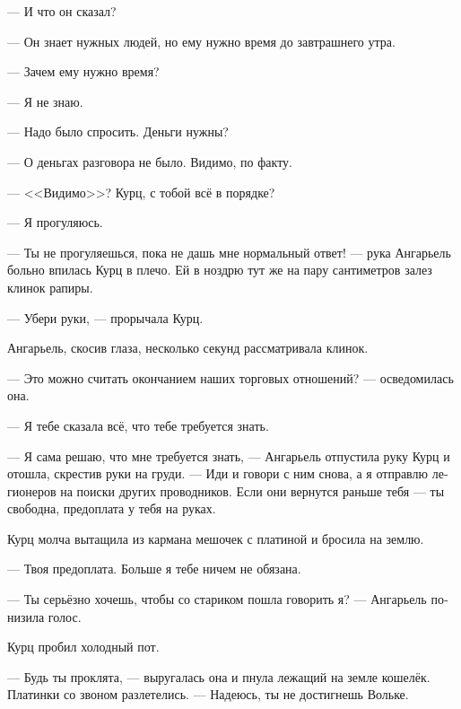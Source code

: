 \documentclass[a4paper,12pt,fleqn]{book}\usepackage{polyglossia}\setdefaultlanguage[babelshorthands=true]{russian}\setotherlanguage{english}\defaultfontfeatures{Ligatures=TeX,Mapping=tex-text}\usepackage{xcolor}\newcommand{\ml}[3]{#2}
\begin{document}
--- И что он сказал?

--- Он знает нужных людей, но ему нужно время до завтрашнего утра.

--- Зачем ему нужно время?

--- Я не знаю.

--- Надо было спросить.
Деньги нужны?

--- О деньгах разговора не было.
Видимо, по факту.

\ml{$0$}
{--- <<Видимо>>?}
{`` `Apparently'?}
\ml{$0$}
{Курц, с тобой всё в порядке?}
{Kurz, are you all right?''}

\ml{$0$}
{--- Я прогуляюсь.}
{``I have a walk.''}

--- Ты не прогуляешься, пока не дашь мне нормальный ответ! --- рука Ангарьель больно впилась Курц в плечо.
Ей в ноздрю тут же на пару сантиметров залез клинок рапиры.

\ml{$0$}
{--- Убери руки, --- прорычала Курц.}
{``Get your hands off,'' Kurz growled.}

Ангарьель, скосив глаза, несколько секунд рассматривала клинок.

\ml{$0$}
{--- Это можно считать окончанием наших торговых отношений? --- осведомилась она.}
{``Can this be considered the end of our trade relations?'' she asked.}

\ml{$0$}
{--- Я тебе сказала всё, что тебе требуется знать.}
{``I've told you everything you need to know.''}

--- Я сама решаю, что мне требуется знать, --- Ангарьель отпустила руку Курц и отошла, скрестив руки на груди.
--- Иди и говори с ним снова, а я отправлю легионеров на поиски других проводников.
\ml{$0$}
{Если они вернутся раньше тебя --- ты свободна, предоплата у тебя на руках.}
{If one of them returns sooner than you, you're dismissed with your pre-payment.''}

Курц молча вытащила из кармана мешочек с платиной и бросила на землю.

\ml{$0$}
{--- Твоя предоплата.}
{``Your pre-payment.}
\ml{$0$}
{Больше я тебе ничем не обязана.}
{I owe you nothing more.''}

\ml{$0$}
{--- Ты серьёзно хочешь, чтобы со стариком пошла говорить я? --- Ангарьель понизила голос.}
{``You really want me to negotiate with the old man?'' Angariel said in a low voice.}

Курц пробил холодный пот.

--- Будь ты проклята, --- выругалась она и пнула лежащий на земле кошелёк.
Платинки со звоном разлетелись.
\ml{$0$}
{--- Надеюсь, ты не достигнешь Вольке.}
{``May you never reach Wolke.''}
\end{document}
